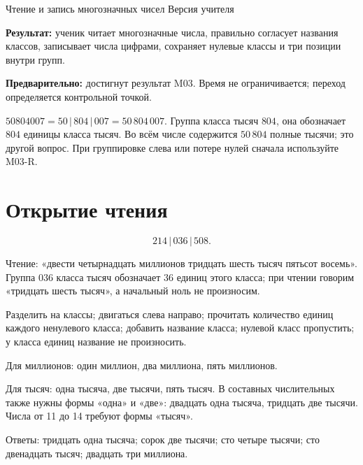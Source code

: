 \worksheettitle
  {Чтение и запись многозначных чисел}
  { Версия учителя}

\begin{teacherbox}
  \textbf{Результат:} ученик читает многозначные числа, правильно согласует
  названия классов, записывает числа цифрами, сохраняет нулевые классы и три
  позиции внутри групп.

  \textbf{Предварительно:} достигнут результат M03. Время не ограничивается;
  переход определяется контрольной точкой.
\end{teacherbox}

\begin{checkpointbox}
  \(50804007=50\,|\,804\,|\,007=50\,804\,007\). Группа класса тысяч \(804\),
  она обозначает \(804\) единицы класса тысяч. Во всём числе содержится
  \(50\,804\) полные тысячи; это другой вопрос. При группировке слева или
  потере нулей сначала используйте M03-R.
\end{checkpointbox}

\section{Открытие чтения}

\[
  214\,|\,036\,|\,508.
\]

Чтение: «двести четырнадцать миллионов тридцать шесть тысяч пятьсот восемь».
Группа \(036\) класса тысяч обозначает \(36\) единиц этого класса; при чтении
говорим «тридцать шесть тысяч», а начальный ноль не произносим.

\begin{teacherbox}[Алгоритм]
  Разделить на классы; двигаться слева направо; прочитать количество единиц
  каждого ненулевого класса; добавить название класса; нулевой класс
  пропустить; у класса единиц название не произносить.
\end{teacherbox}

\begin{teacherbox}
  Для миллионов: один миллион, два миллиона, пять миллионов.

  Для тысяч: одна тысяча, две тысячи, пять тысяч. В составных числительных
  также нужны формы «одна» и «две»: двадцать одна тысяча, тридцать две тысячи.
  Числа от 11 до 14 требуют формы «тысяч».
\end{teacherbox}

Ответы: тридцать одна тысяча; сорок две тысячи; сто четыре тысячи; сто
двенадцать тысяч; двадцать три миллиона.

